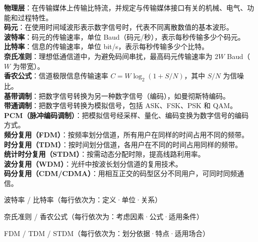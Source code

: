 \documentclass[a4paper,11pt]{article}
\begin{document}
\begin{keyterms}
\textbf{物理层}：在传输媒体上传输比特流，并规定与传输媒体接口有关的机械、电气、功能和过程特性。\\
\textbf{码元}：在使用时间域波形表示数字信号时，代表不同离散数值的基本波形。\\
\textbf{波特率}：码元的传输速率，单位 Baud（码元/秒），表示每秒传输多少个码元。\\
\textbf{比特率}：信息的传输速率，单位 bit/s，表示每秒传输多少个比特。\\
\textbf{奈氏准则}：理想低通信道中，为避免码间串扰，最高码元传输速率为 $2W$ Baud（$W$ 为带宽）。\\
\textbf{香农公式}：信道极限信息传输速率 $C=W\log_2(1+S/N)$，其中 $S/N$ 为信噪比。\\
\textbf{基带调制}：把数字信号转换为另一种数字信号（编码），如曼彻斯特编码。\\
\textbf{带通调制}：把数字信号转换为模拟信号，包括 ASK、FSK、PSK 和 QAM。\\
\textbf{PCM（脉冲编码调制）}：把模拟信号经采样、量化、编码变换为数字信号的编码方式。\\
\textbf{频分复用（FDM）}：按频率划分信道，所有用户在同样的时间占用不同的频带。\\
\textbf{时分复用（TDM）}：按时间划分信道，各用户在不同的时间占用同样的频带。\\
\textbf{统计时分复用（STDM）}：按需动态分配时隙，提高线路利用率。\\
\textbf{波分复用（WDM）}：光纤中按波长划分信道的复用技术。\\
\textbf{码分复用（CDM/CDMA）}：用相互正交的码型区分不同用户，可同时同频通信。
\end{keyterms}

\begin{contrast}{波特率 / 比特率（每行依次为：定义·单位·关系）}
\end{contrast}

\begin{contrast}{奈氏准则 / 香农公式（每行依次为：考虑因素·公式·适用条件）}
\end{contrast}

\begin{contrast}{FDM / TDM / STDM（每行依次为：划分依据·特点·适用场合）}
\end{contrast}
\end{document}

